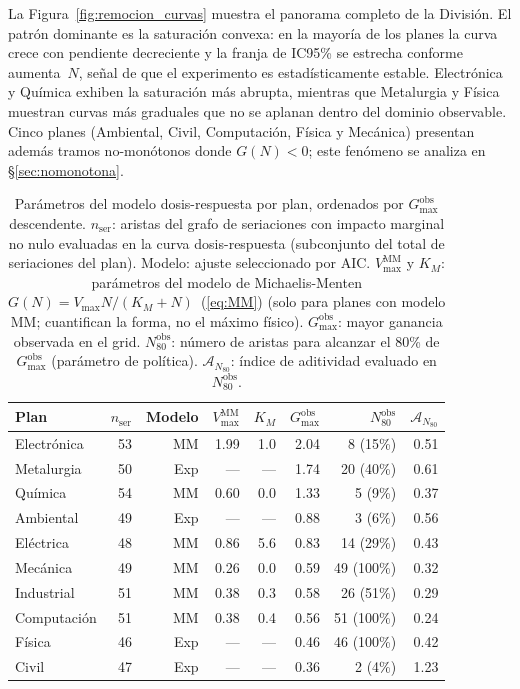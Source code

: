 \documentclass[11pt,letterpaper]{article}
\begin{document}
La Figura~\ref{fig:remocion_curvas} muestra el panorama completo de la
División.
El patrón dominante es la saturación convexa: en la mayoría de los planes la
curva crece con pendiente decreciente y la franja de IC95\% se estrecha
conforme aumenta~$N$, señal de que el experimento es estadísticamente estable.
Electrónica y Química exhiben la saturación más abrupta, mientras
que Metalurgia y Física muestran curvas más graduales que no se aplanan dentro
del dominio observable.
Cinco planes (Ambiental, Civil, Computación, Física y Mecánica) presentan
además tramos no-monótonos donde
$G(N) < 0$; este fenómeno se analiza en \S\ref{sec:nomonotona}.

\begin{table}[H]\centering
\caption{Parámetros del modelo dosis-respuesta por plan, ordenados por
  $G_{\max}^{\mathrm{obs}}$ descendente.
  $n_{\mathrm{ser}}$: aristas del grafo de seriaciones con impacto marginal no nulo evaluadas en la curva dosis-respuesta (subconjunto del total de seriaciones del plan).
  Modelo: ajuste seleccionado por AIC.
  $V_{\max}^{\mathrm{MM}}$ y $K_M$: parámetros del modelo de Michaelis-Menten
  $G(N)=V_{\max}N/(K_M+N)$~(\ref{eq:MM})
  (solo para planes con modelo MM; cuantifican la forma, no el máximo físico).
  $G_{\max}^{\mathrm{obs}}$: mayor ganancia observada en el grid.
  $N_{80}^{\mathrm{obs}}$: número de aristas para alcanzar el 80\% de
  $G_{\max}^{\mathrm{obs}}$ (parámetro de política).
  $\mathcal{A}_{N_{80}}$: índice de aditividad evaluado en $N_{80}^{\mathrm{obs}}$.}
\label{tab:dosis_respuesta}
\small
\setlength{\tabcolsep}{5pt}
\begin{tabular}{l r r r r r r r}
\toprule
Plan & $n_{\mathrm{ser}}$ & Modelo &
  $V_{\max}^{\mathrm{MM}}$ & $K_M$ &
  $G_{\max}^{\mathrm{obs}}$ & $N_{80}^{\mathrm{obs}}$ & $\mathcal{A}_{N_{80}}$ \\
\midrule
Electrónica    & 53 & MM  & 1.99 & 1.0  & 2.04 & \phantom{0}8 (15\%) & 0.51 \\
Metalurgia     & 50 & Exp & ---  & ---  & 1.74 & 20 (40\%) & 0.61 \\
Química        & 54 & MM  & 0.60 & 0.0  & 1.33 & \phantom{0}5 (\phantom{0}9\%) & 0.37 \\
Ambiental      & 49 & Exp & ---  & ---  & 0.88 & \phantom{0}3 (\phantom{0}6\%) & 0.56 \\
Eléctrica      & 48 & MM  & 0.86 & 5.6  & 0.83 & 14 (29\%) & 0.43 \\
Mecánica       & 49 & MM  & 0.26 & 0.0  & 0.59 & 49 (100\%) & 0.32 \\
Industrial     & 51 & MM  & 0.38 & 0.3  & 0.58 & 26 (51\%) & 0.29 \\
Computación    & 51 & MM  & 0.38 & 0.4  & 0.56 & 51 (100\%) & 0.24 \\
Física         & 46 & Exp & ---  & ---  & 0.46 & 46 (100\%) & 0.42 \\
Civil          & 47 & Exp & ---  & ---  & 0.36 & \phantom{0}2 (\phantom{0}4\%) & 1.23 \\
\bottomrule
\end{tabular}
\end{table}
\end{document}
